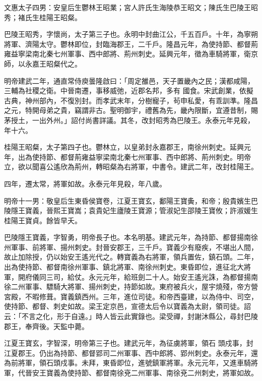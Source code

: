 
\begin{pinyinscope}

 文惠太子四男：安皇后生鬱林王昭業；宮人許氏生海陵恭王昭文；陳氏生巴陵王昭秀；褚氏生桂陽王昭粲。



 巴陵王昭秀，字懷尚，太子第三子也。永明中封曲江公，千五百戶。十年，為寧朔將軍、濟陽太守。鬱林即位，封臨海郡王，二千戶。隆昌元年，為使持節、都督荊雍益寧梁南北秦七州軍事、西中郎將、荊州刺史。延興元年，徵為車騎將軍，衛京師，以永嘉王昭粲代之。



 明帝建武二年，通直常侍庾曇隆啟曰：「周定雒邑，天子置畿內之民；漢都咸陽，三輔為社稷之衛。中晉南遷，事移威弛，近郡名邦，多有
 國食。宋武創業，依擬古典，神州部內，不復別封。而孝武末年，分樹寵子，茍申私愛，有乖訓準。隆昌之元，特開母弟之貴，竊謂非古。聖明御宇，禮舊為先，畿內限斷，宜遵昔制，賜茅授土，一出外州。」詔付尚書詳議。其冬，改封昭秀為巴陵王。永泰元年見殺，年十六。



 桂陽王昭粲，太子第四子也。鬱林立，以皇弟封永嘉郡王，南徐州刺史。延興元年，出為使持節、都督荊雍益寧梁南北秦七州軍事、西中郎將、荊州刺史。明帝立，欲以聞喜公遙欣為荊州，轉昭粲為右將軍，中書令。建武二年，改封桂陽王。



 四年，遷太常，將軍如故。永泰元年見殺，年八歲。



 明帝十一男：敬皇后生東昏侯寶卷，江夏王寶玄，鄱陽王寶夤，和帝；殷貴嬪生巴陵隱王寶義，晉熙王寶嵩；袁貴妃生廬陵王寶源；管淑妃生邵陵王寶攸；許淑媛生桂陽王寶貞。餘皆早夭。



 巴陵隱王寶義，字智勇，明帝長子也。本名明基。建武元年，為持節、都督揚南徐州軍事、前將軍、揚州刺史。封晉安郡王，三千戶。寶義少有廢疾，不堪出人間，故止加除授，仍以始安王遙光代之。轉寶義為右將軍，領兵置佐，鎮石頭。二年，出為使持節、都督南徐州軍事、鎮北將軍、南徐州刺史。東昏即位，進征北大將軍，開府儀同三司，給仗。永元元年，給班劍二十人。始安王遙光誅，為都督揚南徐二州軍事、驃騎大將軍、揚州刺史，持節如故。東府被兵火，屋宇燒殘，帝方營宮殿，不暇修葺。寶義鎮西州。三年，進位司徒。和帝西臺建，以為侍中、司空，使持節、都督、刺史如故。梁王定京邑，宣德太后令以寶義為太尉，領司徒。詔云：「不言之化，形于自遠。」時人皆云此實錄也。梁受禪，封謝沐縣公，尋封巴陵郡王，奉齊後。天監中薨。



 江夏王寶玄，字智深，明帝第三子也。建武元年，為征虜將軍，領石
 頭戍事，封江夏郡王。仍出為持節、都督郢司二州軍事、西中郎將、郢州刺史。永泰元年，還為前將軍，領石頭戍事。未拜，東昏即位，進號鎮軍將軍。永元元年，又進車騎將軍，代晉安王寶義為使持節、都督南徐兗二州軍事、南徐兗二州刺史，將軍如故。




\end{pinyinscope}

